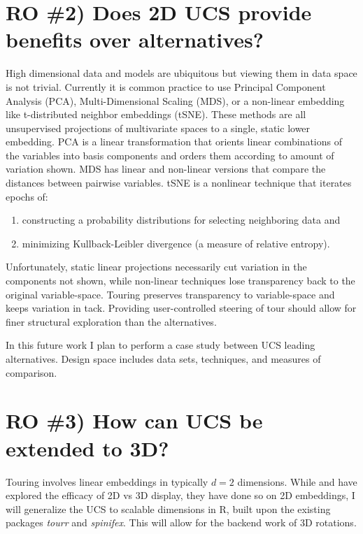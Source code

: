 \documentclass{monashthesis}
\begin{document}
\section{RO \#2) Does 2D UCS provide benefits over
alternatives?}\label{ro-2-does-2d-ucs-provide-benefits-over-alternatives}

High dimensional data and models are ubiquitous but viewing them in data
space is not trivial. Currently it is common practice to use Principal
Component Analysis (PCA), Multi-Dimensional Scaling (MDS), or a
non-linear embedding like t-distributed neighbor embeddings (tSNE).
These methods are all unsupervised projections of multivariate spaces to
a single, static lower embedding. PCA is a linear transformation that
orients linear combinations of the variables into basis components and
orders them according to amount of variation shown. MDS has linear and
non-linear versions that compare the distances between pairwise
variables. tSNE is a nonlinear technique that iterates epochs of:

\begin{enumerate}
\def\labelenumi{\arabic{enumi}.}
\tightlist
\item
  constructing a probability distributions for selecting neighboring
  data and
\item
  minimizing Kullback-Leibler divergence (a measure of relative
  entropy).
\end{enumerate}

Unfortunately, static linear projections necessarily cut variation in
the components not shown, while non-linear techniques lose transparency
back to the original variable-space. Touring preserves transparency to
variable-space and keeps variation in tack. Providing user-controlled
steering of tour should allow for finer structural exploration than the
alternatives.

In this future work I plan to perform a case study between UCS leading
alternatives. Design space includes data sets, techniques, and measures
of comparison.

\section{RO \#3) How can UCS be extended to
3D?}\label{ro-3-how-can-ucs-be-extended-to-3d}

Touring involves linear embeddings in typically \(d=2\) dimensions.
While \textcite{nelson_xgobi_1998} and \textcite{arms_benefits_1999}
have explored the efficacy of 2D vs 3D display, they have done so on 2D
embeddings, I will generalize the UCS to scalable dimensions in R, built
upon the existing packages \emph{tourr} and \emph{spinifex}. This will
allow for the backend work of 3D rotations.
\end{document}
